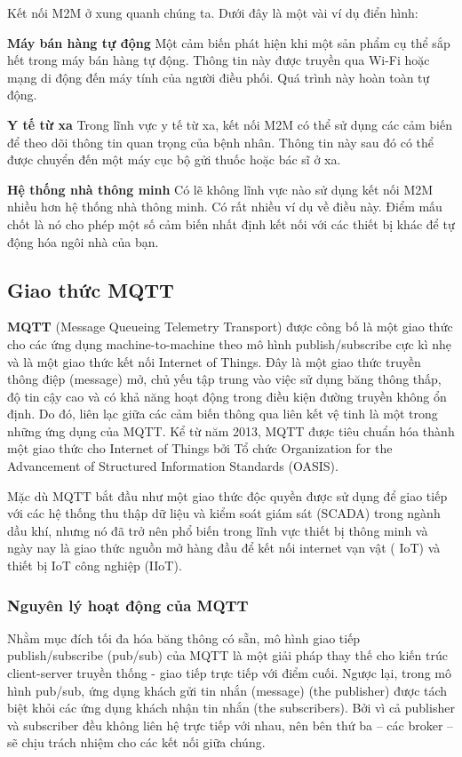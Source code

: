 Kết nối M2M ở xung quanh chúng ta. Dưới đây là một vài ví dụ điển hình:

\textbf{Máy bán hàng tự động}
Một cảm biến phát hiện khi một sản phẩm cụ thể sắp hết trong máy bán hàng tự động. Thông tin này được truyền qua Wi-Fi hoặc mạng di động đến máy tính của người điều phối. Quá trình này hoàn toàn tự động.

\textbf{Y tế từ xa}
Trong lĩnh vực y tế từ xa, kết nối M2M có thể sử dụng các cảm biến để theo dõi thông tin quan trọng của bệnh nhân. Thông tin này sau đó có thể được chuyển đến một máy cục bộ gửi thuốc hoặc bác sĩ ở xa.

\textbf{Hệ thống nhà thông minh}
Có lẽ không lĩnh vực nào sử dụng kết nối M2M nhiều hơn hệ thống nhà thông minh. Có rất nhiều ví dụ về điều này. Điểm mấu chốt là nó cho phép một số cảm biến nhất định kết nối với các thiết bị khác để tự động hóa ngôi nhà của bạn.

\subsection{Giao thức MQTT}

\textbf{MQTT} (Message Queueing Telemetry Transport) được công bố là một giao thức cho các ứng dụng machine-to-machine theo mô hình publish/subscribe cực kì nhẹ và là một giao thức kết nối Internet of Things. Đây là một giao thức truyền thông điệp (message) mở, chủ yếu tập trung vào việc sử dụng băng thông thấp, độ tin cậy cao và có khả năng hoạt động trong điều kiện đường truyền không ổn định. Do đó, liên lạc giữa các cảm biến thông qua liên kết vệ tinh là một trong những ứng dụng của MQTT. Kể từ năm 2013, MQTT được tiêu chuẩn hóa thành một giao thức cho Internet of Things bởi Tổ chức Organization for the Advancement of Structured Information Standards (OASIS).

Mặc dù MQTT bắt đầu như một giao thức độc quyền được sử dụng để giao tiếp với các hệ thống thu thập dữ liệu và kiểm soát giám sát (SCADA) trong ngành dầu khí, nhưng nó đã trở nên phổ biến trong lĩnh vực thiết bị thông minh và ngày nay là giao thức nguồn mở hàng đầu để kết nối internet vạn vật ( IoT) và thiết bị IoT công nghiệp (IIoT).

\subsubsection{Nguyên lý hoạt động của MQTT}
Nhằm mục đích tối đa hóa băng thông có sẵn, mô hình giao tiếp publish/subscribe (pub/sub) của MQTT là một giải pháp thay thế cho kiến trúc client-server truyền thống - giao tiếp trực tiếp với điểm cuối. Ngược lại, trong mô hình pub/sub, ứng dụng khách gửi tin nhắn (message) (the publisher) được tách biệt khỏi các ứng dụng khách nhận tin nhắn (the subscribers). Bởi vì cả publisher và subscriber đều không liên hệ trực tiếp với nhau, nên bên thứ ba -- các broker -- sẽ chịu trách nhiệm cho các kết nối giữa chúng.

